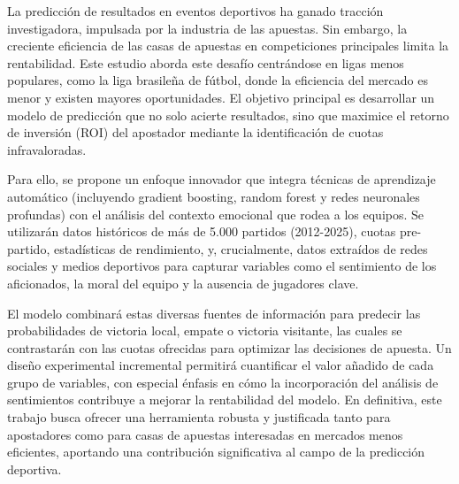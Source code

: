 La predicción de resultados en eventos deportivos ha ganado tracción investigadora, impulsada por la industria de las apuestas. Sin embargo, la creciente eficiencia de las casas de apuestas en competiciones principales limita la rentabilidad. Este estudio aborda este desafío centrándose en ligas menos populares, como la liga brasileña de fútbol, donde la eficiencia del mercado es menor y existen mayores oportunidades. El objetivo principal es desarrollar un modelo de predicción que no solo acierte resultados, sino que maximice el retorno de inversión (ROI) del apostador mediante la identificación de cuotas infravaloradas.

Para ello, se propone un enfoque innovador que integra técnicas de aprendizaje automático (incluyendo gradient boosting, random forest y redes neuronales profundas) con el análisis del contexto emocional que rodea a los equipos. Se utilizarán datos históricos de más de 5.000 partidos (2012-2025), cuotas pre-partido, estadísticas de rendimiento, y, crucialmente, datos extraídos de redes sociales y medios deportivos para capturar variables como el sentimiento de los aficionados, la moral del equipo y la ausencia de jugadores clave.

El modelo combinará estas diversas fuentes de información para predecir las probabilidades de victoria local, empate o victoria visitante, las cuales se contrastarán con las cuotas ofrecidas para optimizar las decisiones de apuesta. Un diseño experimental incremental permitirá cuantificar el valor añadido de cada grupo de variables, con especial énfasis en cómo la incorporación del análisis de sentimientos contribuye a mejorar la rentabilidad del modelo. En definitiva, este trabajo busca ofrecer una herramienta robusta y justificada tanto para apostadores como para casas de apuestas interesadas en mercados menos eficientes, aportando una contribución significativa al campo de la predicción deportiva.



